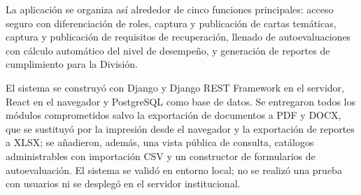 La aplicación se organiza así alrededor de cinco funciones principales: acceso seguro con diferenciación de roles, captura y publicación de cartas temáticas, captura y publicación de requisitos de recuperación, llenado de autoevaluaciones con cálculo automático del nivel de desempeño, y generación de reportes de cumplimiento para la División.

El sistema se construyó con Django y Django REST Framework en el servidor, React en el navegador y PostgreSQL como base de datos. Se entregaron todos los módulos comprometidos salvo la exportación de documentos a PDF y DOCX, que se sustituyó por la impresión desde el navegador y la exportación de reportes a XLSX; se añadieron, además, una vista pública de consulta, catálogos administrables con importación CSV y un constructor de formularios de autoevaluación. El sistema se validó en entorno local; no se realizó una prueba con usuarios ni se desplegó en el servidor institucional.

\newpage
